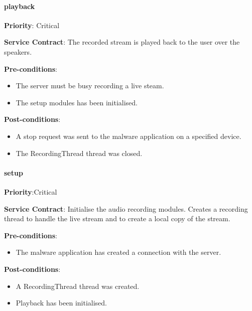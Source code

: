 		
		\paragraph{playback}
			\begin{description}
			    \item{\textbf{Priority}:} Critical%
			    \item{\textbf{Service Contract}:} The recorded stream is played back to the user over the speakers.%
			    \item{\textbf{Pre-conditions}:}%
    			    \begin{itemize}
    			        \item The server must be busy recording a live steam.
    			        \item The setup modules has been initialised.
    			    \end{itemize}
			    \item{\textbf{Post-conditions}:} %
    			    \begin{itemize}
    			    \item A stop request was sent to the malware application on a specified device.
    			    \item The RecordingThread thread was closed.
    			    \end{itemize}
			\end{description}
	
	
        \paragraph{setup}
			\begin{description}
			    \item{\textbf{Priority}:}Critical %
			    \item{\textbf{Service Contract}:} Initialise the audio recording modules. Creates a recording thread to handle the live stream and to create a local copy of the stream.%
			    \item{\textbf{Pre-conditions}:}%
    			    \begin{itemize}
    			        \item The malware application has created a connection with the server.
    			    \end{itemize}
			    \item{\textbf{Post-conditions}:} %
    			    \begin{itemize}
    			    \item A RecordingThread thread was created.
    			    \item Playback has been initialised.
    			    \end{itemize}
			\end{description}
			
